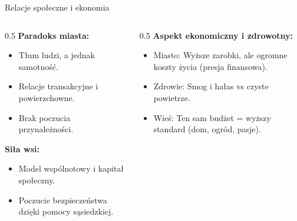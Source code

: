 \begin{frame}{Relacje społeczne i ekonomia}
    \begin{columns}
        \begin{column}{0.5\textwidth}
            \textbf{Paradoks miasta:}
            \begin{itemize}
                \item Tłum ludzi, a jednak samotność.
                \item Relacje transakcyjne i powierzchowne.
                \item Brak poczucia przynależności.
            \end{itemize}
            
            \vspace{0.3cm}
            \textbf{Siła wsi:}
            \begin{itemize}
                \item Model wspólnotowy i kapitał społeczny.
                \item Poczucie bezpieczeństwa dzięki pomocy sąsiedzkiej.
            \end{itemize}
        \end{column}

        \begin{column}{0.5\textwidth}
            \textbf{Aspekt ekonomiczny i zdrowotny:}
            \begin{itemize}
                \item Miasto: Wyższe zarobki, ale ogromne koszty życia (presja finansowa).
                \item Zdrowie: Smog \cite{link3} i hałas vs czyste powietrze.
                \item Wieś: Ten sam budżet = wyższy standard (dom, ogród, pasje).
            \end{itemize}
        \end{column}
    \end{columns}
\end{frame}

